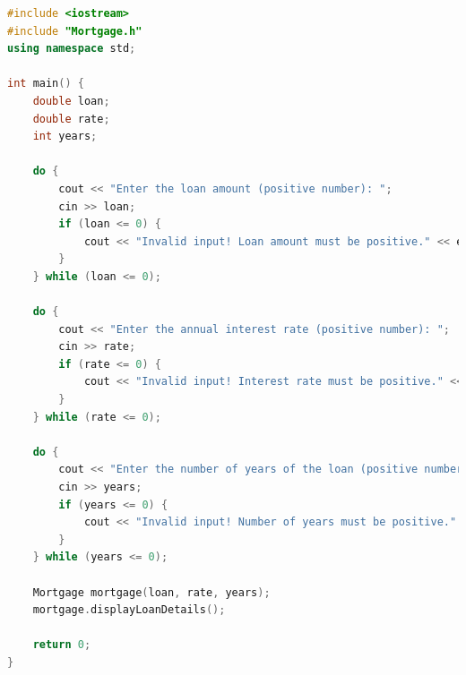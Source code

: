 \documentclass{article}
\begin{document}
\begin{lstlisting}[language=C++, caption=main.cpp]
#include <iostream>
#include "Mortgage.h"
using namespace std;

int main() {
    double loan;
    double rate;
    int years;

    do {
        cout << "Enter the loan amount (positive number): ";
        cin >> loan;
        if (loan <= 0) {
            cout << "Invalid input! Loan amount must be positive." << endl;
        }
    } while (loan <= 0);

    do {
        cout << "Enter the annual interest rate (positive number): ";
        cin >> rate;
        if (rate <= 0) {
            cout << "Invalid input! Interest rate must be positive." << endl;
        }
    } while (rate <= 0);

    do {
        cout << "Enter the number of years of the loan (positive number): ";
        cin >> years;
        if (years <= 0) {
            cout << "Invalid input! Number of years must be positive." << endl;
        }
    } while (years <= 0);

    Mortgage mortgage(loan, rate, years);
    mortgage.displayLoanDetails();

    return 0;
}
\end{lstlisting}
\end{document}
